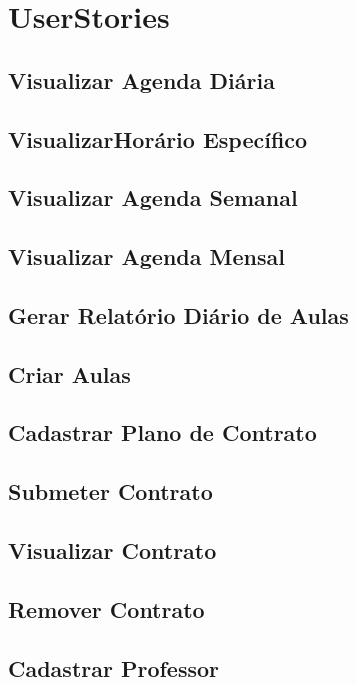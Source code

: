 \section[UserStories]{UserStories}
\subsection[Visualizar Agenda Diária]{Visualizar Agenda Diária}
\subsection[Visualizar Horário Específico]{VisualizarHorário Específico}
\subsection[Visualizar Agenda Semanal]{Visualizar Agenda Semanal}
\subsection[Visualizar Agenda Mensal]{Visualizar Agenda Mensal}
\subsection[Gerar Relatório Diário de Aulas]{Gerar Relatório Diário de Aulas}
\subsection[Criar Aulas]{Criar Aulas}
\subsection[Cadastrar Plano de Contrato]{Cadastrar Plano de Contrato}
\subsection[Submeter Contrato]{Submeter Contrato}
\subsection[Visualizar Contrato]{Visualizar Contrato}
\subsection[Remover Contrato]{Remover Contrato}
\subsection[Cadastrar Professor]{Cadastrar Professor}
